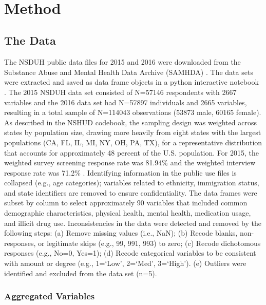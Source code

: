 \\\documentclass[sigconf]{acmart}
\begin{document}

\section{Method}

\subsection{The Data}

The NSDUH public data files for 2015 and 2016 were downloaded from the
Substance Abuse and Mental Health Data Archive (SAMHDA) \cite{samhsa18}. 
The data sets were extracted and saved as data frame objects in a python 
interactive notebook \cite{mckinney17, vanderplas17}. The 2015 NSDUH data set 
consisted of N=57146 respondents with 2667 variables and the 2016 data set had 
N=57897 individuals and 2665 variables, resulting in a total sample of N=114043 
observations (53873 male, 60165 female). As described in the NSHUD codebook, 
the sampling design was weighted across states by population size, drawing more 
heavily from eight states with the largest populations (CA, FL, IL, MI, NY, OH, 
PA, TX), for a representative distribution that accounts for approximately 
48 percent of the U.S. population. For 2015, the weighted survey screening 
response rate  was 81.94\% and the weighted interview response rate was 71.2\% 
\cite{samhsa18}. Identifying information in the public use files is collapsed 
(e.g., age categories); variables related to ethnicity, immigration status, and 
state identifiers are removed to ensure confidentiality. The data frames were 
subset by column to select approximately 90 variables that included common 
demographic characteristics, physical health, mental health, medication usage, 
and illicit drug use. Inconsistencies in the data were detected and removed by
the following steps: (a) Remove missing values (i.e., NaN); (b) Recode blanks, 
non-responses, or legitimate skips (e.g., 99, 991, 993) to zero; (c) Recode 
dichotomous responses (e.g., No=0, Yes=1); (d) Recode categorical variables 
to be consistent with amount or degree  (e.g., 1=`Low', 2=`Med', 3=`High'). 
(e) Outliers were identified and excluded from the data set (n=5).


\subsubsection{Aggregated Variables}
\end{document}
